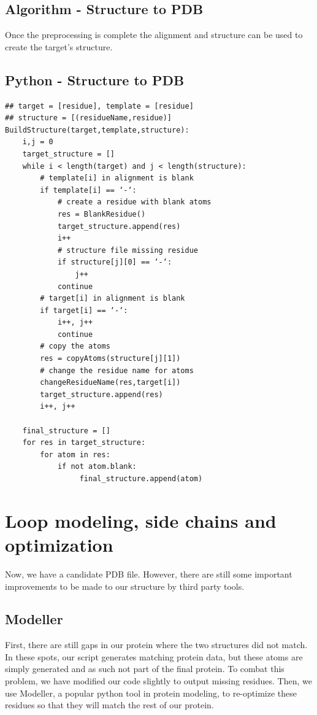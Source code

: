 \documentclass{article}
\begin{document}
\newpage
\subsection{Algorithm - Structure to PDB}

Once the preprocessing is complete the alignment and structure can be used to create the target's structure.

\subsection{Python - Structure to PDB}

\begin{lstlisting}
## target = [residue], template = [residue]
## structure = [(residueName,residue)]
BuildStructure(target,template,structure):
    i,j = 0
    target_structure = []
    while i < length(target) and j < length(structure):
        # template[i] in alignment is blank
        if template[i] == ‘-‘:
            # create a residue with blank atoms
            res = BlankResidue()
            target_structure.append(res)
            i++
            # structure file missing residue
            if structure[j][0] == ‘-‘:
                j++
            continue
        # target[i] in alignment is blank
        if target[i] == ‘-‘:
            i++, j++
            continue
        # copy the atoms
        res = copyAtoms(structure[j][1])
        # change the residue name for atoms
        changeResidueName(res,target[i])
        target_structure.append(res)
        i++, j++
    
    final_structure = []
    for res in target_structure:
        for atom in res:
            if not atom.blank:
                 final_structure.append(atom)
\end{lstlisting}


\section{Loop modeling, side chains and optimization}

Now, we have a candidate PDB file.  However, there are still some important improvements to be made to our structure by third party tools.

\subsection{Modeller}

First, there are still gaps in our protein where the two structures did not match.  In these spots, our script generates matching protein data, but these atoms are simply generated and as such not part of the final protein.  To combat this problem, we have modified our code slightly to output missing residues.  Then, we use Modeller, a popular python tool in protein modeling, to re-optimize these residues so that they will match the rest of our protein. 
\end{document}

